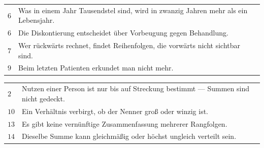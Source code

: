 \begin{merksatz}
\begin{center}
{\small
\renewcommand{\arraystretch}{1.48}
\begin{tabular}{@{}P{1.4cm}P{7.0cm}@{}}
\toprule
$6$ & Was in einem Jahr Tausendstel sind, wird in zwanzig Jahren mehr als ein Lebensjahr.\\
$6$ & Die Diskontierung entscheidet über Vorbeugung gegen Behandlung.\\
$7$ & Wer rückwärts rechnet, findet Reihenfolgen, die vorwärts nicht sichtbar sind.\\
$9$ & Beim letzten Patienten erkundet man nicht mehr.\\
\bottomrule
\end{tabular}}
\end{center}

\begin{center}
\begin{minipage}{0.88\textwidth}
\end{minipage}
\end{center}
\end{merksatz}

\begin{merksatz}
\begin{center}
{\small
\renewcommand{\arraystretch}{1.48}
\begin{tabular}{@{}P{1.4cm}P{7.0cm}@{}}
\toprule
$2$ & Nutzen einer Person ist nur bis auf Streckung bestimmt --- Summen sind nicht gedeckt.\\
$10$ & Ein Verhältnis verbirgt, ob der Nenner groß oder winzig ist.\\
$13$ & Es gibt keine vernünftige Zusammenfassung mehrerer Rangfolgen.\\
$14$ & Dieselbe Summe kann gleichmäßig oder höchst ungleich verteilt sein.\\
\bottomrule
\end{tabular}}
\end{center}

\begin{center}
\begin{minipage}{0.88\textwidth}
\end{minipage}
\end{center}
\end{merksatz}

